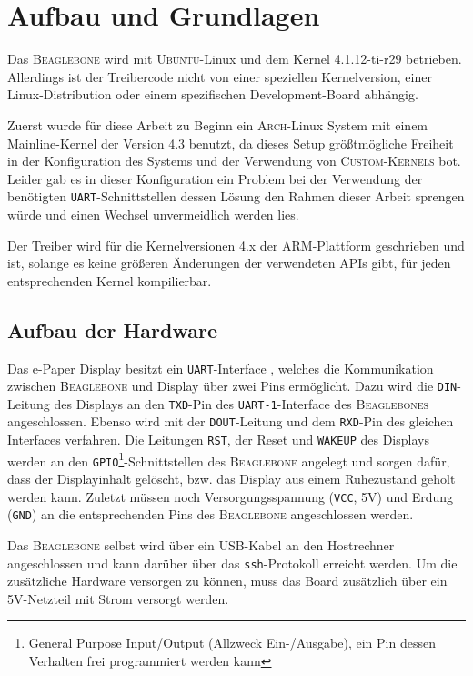 \chapter{Aufbau und Grundlagen} %
Das \textsc{Beaglebone} wird mit \textsc{Ubuntu}-Linux und dem Kernel 4.1.12-ti-r29 betrieben. Allerdings ist der Treibercode nicht von einer speziellen Kernelversion, einer Linux-Distribution oder einem spezifischen Development-Board abhängig. 

Zuerst wurde für diese Arbeit zu Beginn ein \textsc{Arch}-Linux System mit einem Mainline-Kernel der Version 4.3 benutzt, da dieses Setup größtmögliche Freiheit in der Konfiguration des Systems und der Verwendung von \textsc{Custom-Kernels} bot. Leider gab es in dieser Konfiguration ein Problem bei der Verwendung der benötigten \texttt{UART}-Schnittstellen dessen Lösung den Rahmen dieser Arbeit sprengen würde und einen Wechsel unvermeidlich werden lies.

Der Treiber wird für die Kernelversionen 4.x der \textsc{ARM}-Plattform geschrieben und ist, solange es keine größeren Änderungen der verwendeten APIs gibt, für jeden entsprechenden Kernel kompilierbar.

\section{Aufbau der Hardware}
Das e-Paper Display besitzt ein \texttt{UART}-Interface %
, welches die Kommunikation zwischen \textsc{Beaglebone} und Display über zwei Pins ermöglicht. Dazu wird die \texttt{DIN}-Leitung des Displays an den \texttt{TXD}-Pin des \texttt{UART-1}-Interface des \textsc{Beaglebones} angeschlossen. Ebenso wird mit der \texttt{DOUT}-Leitung und dem \texttt{RXD}-Pin des gleichen Interfaces verfahren. Die Leitungen \texttt{RST}, der Reset und \texttt{WAKEUP} des Displays werden an den \texttt{GPIO}\footnote{General Purpose Input/Output (Allzweck Ein-/Ausgabe), ein Pin dessen Verhalten frei programmiert werden kann}-Schnittstellen des \textsc{Beaglebone} angelegt und sorgen dafür, dass der Displayinhalt gelöscht, bzw. das Display aus einem Ruhezustand geholt werden kann. Zuletzt müssen noch Versorgungsspannung (\texttt{VCC}, 5V) und Erdung (\texttt{GND}) an die entsprechenden Pins des \textsc{Beaglebone} angeschlossen werden.  

Das \textsc{Beaglebone} selbst wird über ein USB-Kabel an den Hostrechner angeschlossen und kann darüber über das \texttt{ssh}-Protokoll erreicht werden. Um die zusätzliche Hardware versorgen zu können, muss das Board zusätzlich über ein 5V-Netzteil mit Strom versorgt werden. 

